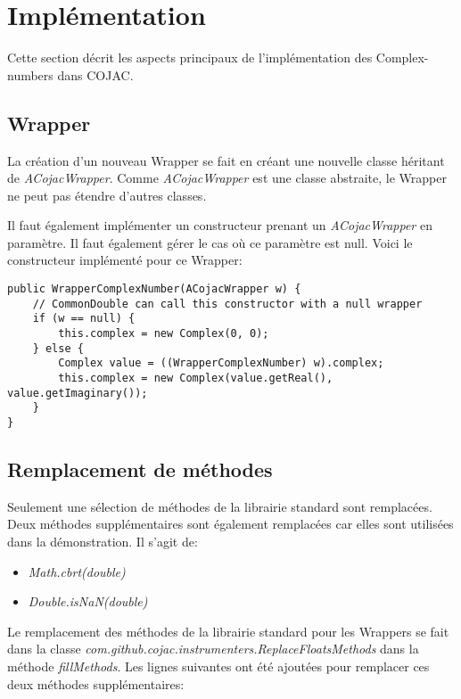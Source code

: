 \section{Implémentation}

Cette section décrit les aspects principaux de l'implémentation des \glspl{Complex-number} dans \gls{COJAC}.

\subsection{Wrapper}
\label{sec:complex_implementation_wrapper}

La création d'un nouveau \gls{Wrapper} se fait en créant une nouvelle classe héritant de \textit{ACojacWrapper}. Comme \textit{ACojacWrapper} est une classe abstraite, le \gls{Wrapper} ne peut pas étendre d'autres classes.

Il faut également implémenter un constructeur prenant un \textit{ACojacWrapper} en paramètre. Il faut également gérer le cas où ce paramètre est null. Voici le constructeur implémenté pour ce \gls{Wrapper}:

\begin{verbatim}
public WrapperComplexNumber(ACojacWrapper w) {
    // CommonDouble can call this constructor with a null wrapper
    if (w == null) {
        this.complex = new Complex(0, 0);
    } else {
        Complex value = ((WrapperComplexNumber) w).complex;
        this.complex = new Complex(value.getReal(), value.getImaginary());
    }
}
\end{verbatim}

\subsection{Remplacement de méthodes}
\label{sec:complex_implementation_methods}

Seulement une sélection de méthodes de la librairie standard sont remplacées. Deux méthodes supplémentaires sont également remplacées car elles sont utilisées dans la démonstration. Il s'agit de:
\begin{itemize}
    \item \textit{Math.cbrt(double)}
    \item \textit{Double.isNaN(double)}
\end{itemize}

Le remplacement des méthodes de la librairie standard pour les \glspl{Wrapper} se fait dans la classe \textit{com.github.cojac.instrumenters.ReplaceFloatsMethods} dans la méthode \textit{fillMethods}. Les lignes suivantes ont été ajoutées pour remplacer ces deux méthodes supplémentaires:

